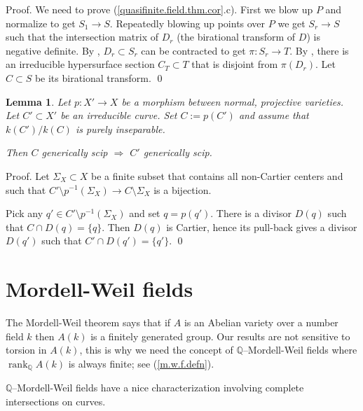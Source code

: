 \documentclass{amsart}
\newtheorem{lem}[thm]{Lemma}
\theoremstyle{definition}
\theoremstyle{remark}
\newcommand{\q}[0]{{\mathbb Q}}
\newcommand{\qrank}[0]{\operatorname{rank}_{\q}}
\begin{document}
Proof. We need to prove (\ref{quasifinite.field.thm.cor}.c). First we blow up $P$ and normalize to get $S_1\to S$. Repeatedly blowing up points over $P$ we get
$S_r\to S$ such that the intersection matrix of $D_r$  (the birational transform of $D$) is negative definite. By \cite{Artin62},  $D_r\subset S_r$ can be contracted  to get  $\pi:S_r\to T$. 
By \cite{cha-poo},  there is  an irreducible hypersurface section $C_T\subset T$ that is disjoint from $\pi(D_r)$.  Let $C\subset S$ be its birational transform. \qed



















\begin{lem} \label{genscip.pullback.lem}
Let $p:X'\to X$ be a  morphism between normal, projective varieties. Let $C'\subset X'$ be an irreducible  curve. Set $C:=p(C')$ and assume that
$k(C') /k(C)$ is purely inseparable. 

Then $C$ generically  scip    $\Rightarrow$ $C'$ generically  scip.
\end{lem}

Proof. Let $\Sigma_X\subset X$ be a finite subset 
that contains all non-Cartier centers and such that 
  $C'\setminus p^{-1}(\Sigma_X)\to C\setminus \Sigma_X$ is a bijection. 


Pick any $q'\in C'\setminus p^{-1}(\Sigma_X)$ and set $q=p(q')$. 
There is a divisor $D(q)$ such that   $C\cap D(q)=\{q\}$. 
Then $D(q)$ is Cartier,  hence its pull-back gives a divisor
$D(q')$ such that  $C'\cap D(q')=\{q'\}$. \qed



\section{Mordell-Weil fields}\label{Mordell-Weil-fields.sec}

The Mordell-Weil theorem says that if $A$ is an Abelian variety over a number field $k$ then  $A(k)$ is a finitely generated group. 
Our results are not sensitive to torsion in $A(k)$, this is why we
need the concept of $\q$--Mordell-Weil fields  where
$\qrank A(k)$ is always finite; see (\ref{m.w.f.defn}). 


 $\q$--Mordell-Weil fields have a nice characterization involving complete intersections on curves.
\end{document}
